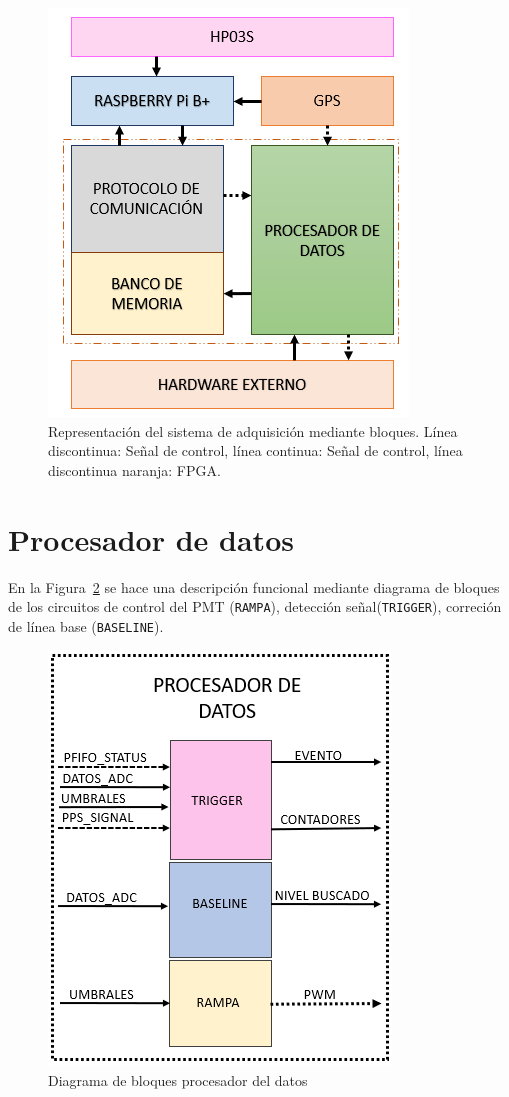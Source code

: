 \begin{figure}[H]
\includegraphics[scale=0.9]{Figs/hardware.PNG} 
\centering
\caption[Representación del sistema de adquisición mediante bloques]{Representación del sistema de adquisición mediante bloques. Línea discontinua: Señal de control, línea continua: Señal de control, línea discontinua naranja: FPGA.} 
\label{diagrama}
\end{figure}

\section{Procesador de datos}
En la Figura~\ref{procesador} se hace una descripción funcional mediante diagrama de bloques de los circuitos de control del PMT (\texttt{RAMPA}), detección señal(\texttt{TRIGGER}), correción de línea base (\texttt{BASELINE}).

\begin{figure}[H]
\includegraphics[scale=0.8]{Figs/procesa.PNG} 
\centering
\caption{Diagrama de bloques procesador del datos} 
\label{procesador}
\end{figure}

